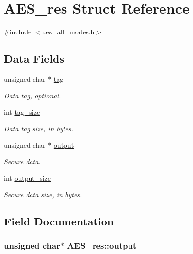 \hypertarget{struct_a_e_s__res}{\section{A\+E\+S\+\_\+res Struct Reference}
\label{struct_a_e_s__res}
}


{\ttfamily \#include $<$aes\+\_\+all\+\_\+modes.\+h$>$}

\subsection*{Data Fields}
\begin{DoxyCompactItemize}
\item 
unsigned char $\ast$ \hyperlink{struct_a_e_s__res_af57433723c87b6125943c41fa902269a}{tag}
\begin{DoxyCompactList}\small\item\em Data tag, optional. \end{DoxyCompactList}\item 
int \hyperlink{struct_a_e_s__res_acf6cd4c6f86cbf7831928d484af3cc59}{tag\+\_\+size}
\begin{DoxyCompactList}\small\item\em Data tag size, in bytes. \end{DoxyCompactList}\item 
unsigned char $\ast$ \hyperlink{struct_a_e_s__res_a4ed6f817ef011e36d910704fa1aefb9b}{output}
\begin{DoxyCompactList}\small\item\em Secure data. \end{DoxyCompactList}\item 
int \hyperlink{struct_a_e_s__res_a5a411bbb0139ee066b9a50c44cae8cef}{output\+\_\+size}
\begin{DoxyCompactList}\small\item\em Secure data size, in bytes. \end{DoxyCompactList}\end{DoxyCompactItemize}


\subsection{Field Documentation}
\hypertarget{struct_a_e_s__res_a4ed6f817ef011e36d910704fa1aefb9b}{
\subsubsection[{output}]{\setlength{\rightskip}{0pt plus 5cm}unsigned char$\ast$ A\+E\+S\+\_\+res\+::output}}\label{struct_a_e_s__res_a4ed6f817ef011e36d910704fa1aefb9b}


